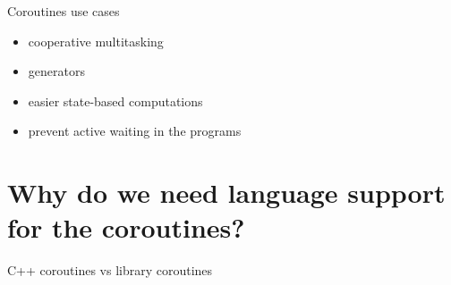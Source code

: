 \documentclass[10pt]{beamer}
\begin{document}
\begin{frame}{Coroutines use cases}
	\begin{itemize}
		\item cooperative multitasking
		\item generators
		\item easier state-based computations
		\item prevent active waiting in the programs
	\end{itemize}
\end{frame}

\section{Why do we need language support for the coroutines?}
\begin{frame}{C++ coroutines vs library coroutines}
\begin{columns}[t]


\end{columns}
\end{frame}
\end{document}
